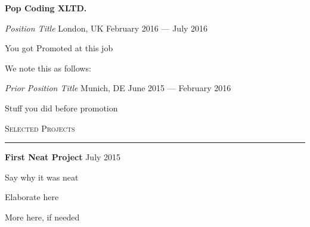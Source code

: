 \documentclass[letterpaper]{article}
\begin{document}
	{\large\textbf{Pop Coding XLTD.}} \par
	{\em Position Title} London, UK\hfill
	February 2016 --- July 2016\par

\begin{compactitem}

	\item You got Promoted at this job\par

	\item We note this as follows:\par

\end{compactitem}

\vspace{2pt}

	{\em Prior Position Title} Munich, DE\hfill
	June 2015 --- February 2016

\begin{compactitem}

	\item Stuff you did before promotion

\end{compactitem}

\vspace{8pt}


\begin{centering}

	{\Large\scshape Selected Projects\\[4pt]\hrule\vspace{4pt}}

\end{centering}


	{\large\textbf{First Neat Project}} \hfill July 2015\par
\vspace{4pt}

\begin{compactitem}

	\item Say why it was neat\par

	\item Elaborate here\par

    \item More here, if needed\par

\end{compactitem}
\end{document}
